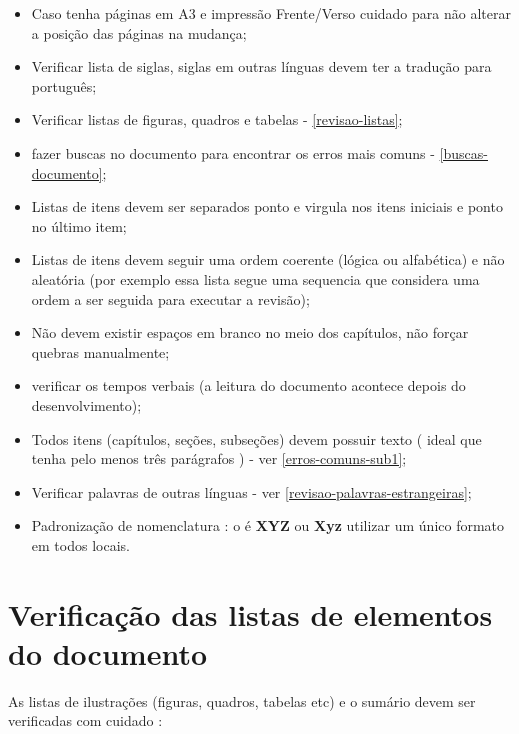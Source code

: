 \begin{itemize}
    \item Caso tenha páginas em A3 e impressão Frente/Verso cuidado para não alterar a posição das páginas na mudança;
    
    \item Verificar lista de siglas, siglas em outras línguas devem ter a tradução para português;

    \item Verificar listas de figuras, quadros e tabelas - \autoref{revisao-listas};

    \item fazer buscas no documento para encontrar os erros mais comuns - \autoref{buscas-documento};
    
    \item Listas de itens devem ser separados ponto e virgula nos itens iniciais e ponto no último item;
    
    \item Listas de itens devem seguir uma ordem coerente (lógica ou alfabética) e não aleatória (por exemplo essa lista segue uma sequencia que considera uma ordem a ser seguida para executar a revisão);
    
    \item Não devem existir espaços em branco no meio dos capítulos, não forçar quebras manualmente;
    
    \item verificar os tempos verbais (a leitura do documento acontece depois do desenvolvimento);
    
    \item Todos itens (capítulos, seções, subseções) devem possuir texto ( ideal que tenha pelo menos três parágrafos ) - ver \autoref{erros-comuns-sub1};

    \item Verificar palavras de outras línguas - ver \autoref{revisao-palavras-estrangeiras};
    
    \item Padronização de nomenclatura : o é \textbf{XYZ} ou \textbf{Xyz} utilizar um único formato em todos locais.
    
\end{itemize}

\section{Verificação das listas de elementos do documento}
\label{revisao-listas}

As listas de ilustrações (figuras, quadros, tabelas etc) e o sumário devem ser verificadas com cuidado :

